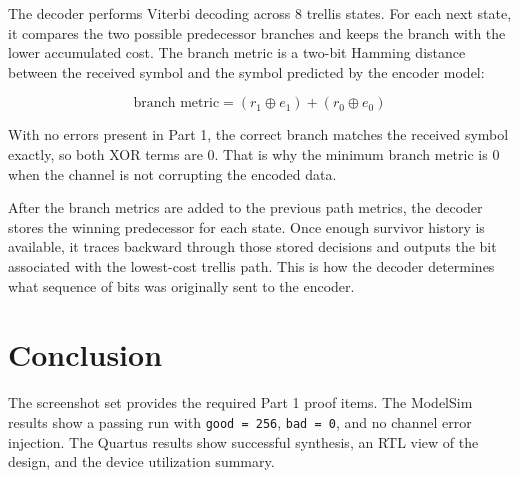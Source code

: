 \documentclass{article}
\begin{document}
The decoder performs Viterbi decoding across 8 trellis states. For each next state, it compares the two possible
predecessor branches and keeps the branch with the lower accumulated cost. The branch metric is a two-bit Hamming
distance between the received symbol and the symbol predicted by the encoder model:

\[
\text{branch metric} = (r_1 \oplus e_1) + (r_0 \oplus e_0)
\]

With no errors present in Part 1, the correct branch matches the received symbol exactly, so both XOR terms are 0.
That is why the minimum branch metric is 0 when the channel is not corrupting the encoded data.

After the branch metrics are added to the previous path metrics, the decoder stores the winning predecessor for
each state. Once enough survivor history is available, it traces backward through those stored decisions and
outputs the bit associated with the lowest-cost trellis path. This is how the decoder determines what sequence
of bits was originally sent to the encoder.

\section{Conclusion}

The screenshot set provides the required Part 1 proof items. The ModelSim results show a passing run with
\texttt{good = 256}, \texttt{bad = 0}, and no channel error injection. The Quartus results show successful
synthesis, an RTL view of the design, and the device utilization summary.
\end{document}
